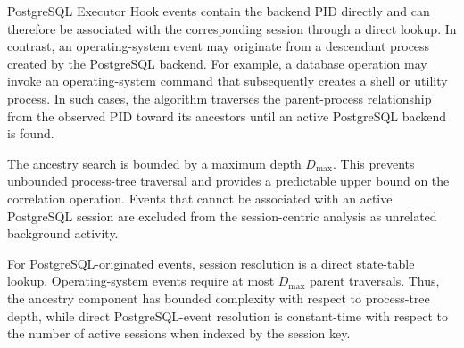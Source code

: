 \documentclass[conference]{IEEEtran}
\begin{document}
PostgreSQL Executor Hook events contain the backend PID directly and can therefore be associated with the corresponding session through a direct lookup. In contrast, an operating-system event may originate from a descendant process created by the PostgreSQL backend. For example, a database operation may invoke an operating-system command that subsequently creates a shell or utility process. In such cases, the algorithm traverses the parent-process relationship from the observed PID toward its ancestors until an active PostgreSQL backend is found.

The ancestry search is bounded by a maximum depth $D_{\max}$. This prevents unbounded process-tree traversal and provides a predictable upper bound on the correlation operation. Events that cannot be associated with an active PostgreSQL session are excluded from the session-centric analysis as unrelated background activity.

\begin{algorithm}[t]
\caption{Session-Anchored Correlation (SAC)}
\label{alg:sac}
\small
{}
\end{algorithm}

For PostgreSQL-originated events, session resolution is a direct state-table lookup. Operating-system events require at most $D_{\max}$ parent traversals. Thus, the ancestry component has bounded complexity with respect to process-tree depth, while direct PostgreSQL-event resolution is constant-time with respect to the number of active sessions when indexed by the session key.
\end{document}
